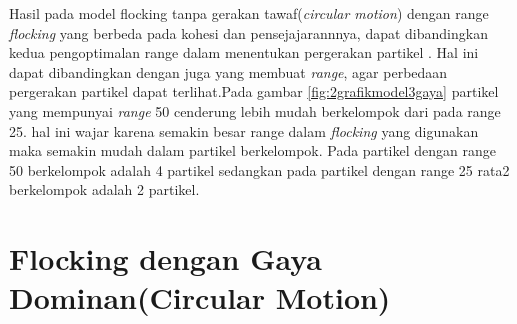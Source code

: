 Hasil pada model flocking tanpa gerakan tawaf(\textit{circular motion}) dengan range \textit{flocking} yang berbeda pada kohesi dan pensejajarannnya, dapat dibandingkan kedua pengoptimalan range dalam menentukan pergerakan partikel . Hal ini dapat dibandingkan dengan \citep{HUTH1992} juga yang membuat \textit{range}, agar perbedaan pergerakan partikel dapat terlihat.Pada gambar \ref{fig:2grafikmodel3gaya} partikel yang mempunyai \textit{range} 50 cenderung lebih mudah berkelompok  dari pada range 25. hal ini wajar karena semakin besar range dalam \textit{flocking} yang digunakan maka semakin mudah dalam partikel berkelompok. Pada partikel dengan range 50 berkelompok adalah 4 partikel 
sedangkan pada partikel dengan range 25 rata2 berkelompok adalah 2 partikel.

\section{Flocking dengan Gaya Dominan(Circular Motion)}%

